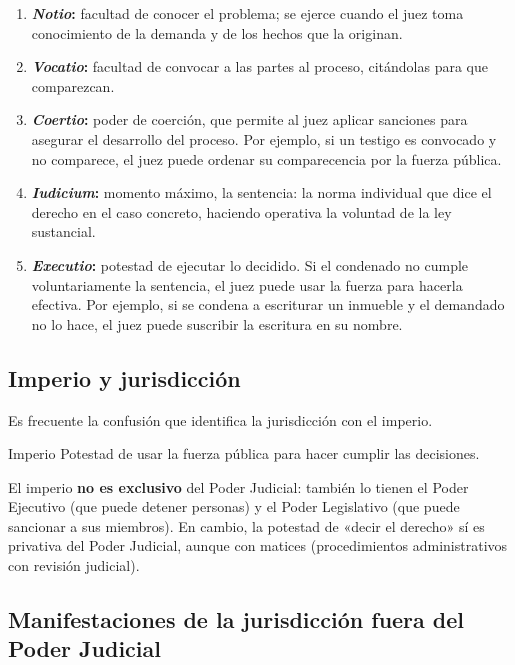 \documentclass[12pt,oneside]{book}
\begin{document}
\begin{enumerate}
\item \textbf{\textit{Notio}:} facultad de conocer el problema; se ejerce cuando el juez toma conocimiento de la demanda y de los hechos que la originan.
\item \textbf{\textit{Vocatio}:} facultad de convocar a las partes al proceso, citándolas para que comparezcan.
\item \textbf{\textit{Coertio}:} poder de coerción, que permite al juez aplicar sanciones para asegurar el desarrollo del proceso. Por ejemplo, si un testigo es convocado y no comparece, el juez puede ordenar su comparecencia por la fuerza pública.
\item \textbf{\textit{Iudicium}:} momento máximo, la sentencia: la norma individual que dice el derecho en el caso concreto, haciendo operativa la voluntad de la ley sustancial.
\item \textbf{\textit{Executio}:} potestad de ejecutar lo decidido. Si el condenado no cumple voluntariamente la sentencia, el juez puede usar la fuerza para hacerla efectiva. Por ejemplo, si se condena a escriturar un inmueble y el demandado no lo hace, el juez puede suscribir la escritura en su nombre.
\end{enumerate}

\subsection{Imperio y jurisdicción}

Es frecuente la confusión que identifica la jurisdicción con el imperio.

\begin{definicion}{Imperio}
Potestad de usar la fuerza pública para hacer cumplir las decisiones.
\end{definicion}

El imperio \textbf{no es exclusivo} del Poder Judicial: también lo tienen el Poder Ejecutivo (que puede detener personas) y el Poder Legislativo (que puede sancionar a sus miembros). En cambio, la potestad de «decir el derecho» sí es privativa del Poder Judicial, aunque con matices (procedimientos administrativos con revisión judicial).

\subsection{Manifestaciones de la jurisdicción fuera del Poder Judicial}
\end{document}
